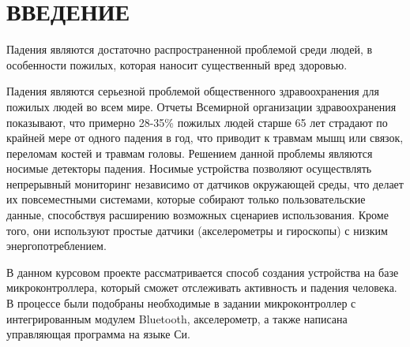 \begin{sloppypar} %
\newpage %
\section*{ВВЕДЕНИЕ} %
Падения являются достаточно распространенной проблемой среди людей, в особенности пожилых, которая  наносит существенный вред здоровью. 

Падения являются серьезной проблемой общественного здравоохранения для пожилых людей во всем мире. Отчеты Всемирной организации здравоохранения показывают, что примерно 28-35\% пожилых людей старше 65 лет страдают по крайней мере от одного падения в год, что приводит к травмам мышц или связок, переломам костей и травмам головы. Решением данной проблемы являются носимые детекторы падения. Носимые устройства позволяют осуществлять непрерывный мониторинг независимо от датчиков окружающей среды, что делает их повсеместными системами, которые собирают только пользовательские данные, способствуя расширению возможных сценариев использования. Кроме того, они используют простые датчики (акселерометры и гироскопы) с низким энергопотреблением.

В данном курсовом проекте  рассматривается способ создания устройства на базе микроконтроллера, который сможет отслеживать активность и падения человека.  В процессе были подобраны необходимые в задании микроконтроллер с интегрированным модулем Bluetooth, акселерометр, а также написана управляющая программа на языке Си. 


\end{sloppypar}
